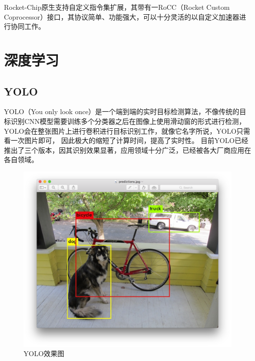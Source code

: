     Rocket-Chip原生支持自定义指令集扩展，其带有一RoCC（Rocket Custom Coprocessor）接口，其协议简单、功能强大，可以十分灵活的以自定义加速器进行协同工作。


\section{深度学习}
    \subsection{YOLO}
    YOLO（You only look once）是一个端到端的实时目标检测算法，不像传统的目标识别CNN模型需要训练多个分类器之后在图像上使用滑动窗的形式进行检测，YOLO会在整张图片上进行卷积进行目标识别工作，就像它名字所说，YOLO只需看一次图片即可，
    因此极大的缩短了计算时间，提高了实时性。
    目前YOLO已经推出了三个版本，因其识别效果显著，应用领域十分广泛，已经被各大厂商应用在各自领域。
    \begin{figure}[h]
        \centering
        \includegraphics[scale=0.2]{../pdf/yolo.png}
        \caption{YOLO效果图}
        \label{}
    \end{figure}
